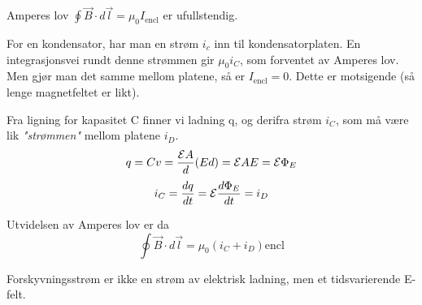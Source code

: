 Amperes lov $\oint\vec{B}\cdot d\vec{l}=\mu_0I_{\text{encl}}$ er ufullstendig.

For en kondensator, har man en strøm $i_c$ inn til kondensatorplaten.
En integrasjonsvei rundt denne strømmen gir $\mu_0i_C$,
som forventet av Amperes lov.
Men gjør man det samme mellom platene, så er $I_{\text{encl}}=0$.
Dette er motsigende (så lenge magnetfeltet er likt).

Fra ligning for kapasitet C finner vi ladning q, og derifra strøm $i_C$,
som må være lik \emph{"strømmen"} mellom platene $i_D$.
$$q = Cv
  = \frac{\mathcal{E} A}{d}(Ed)
  = \mathcal{E} AE
  = \mathcal{E} \Phi_E$$
$$i_C = \frac{dq}{dt}
  = \mathcal{E} \frac{d\Phi_E}{dt}
  = i_D$$

Utvidelsen av Amperes lov er da
$$\oint\vec{B}\cdot d\vec{l}=\mu_0(i_C+i_D){\text{encl}}$$

Forskyvningsstrøm er ikke en strøm av elektrisk ladning,
men et tidsvarierende E-felt.
